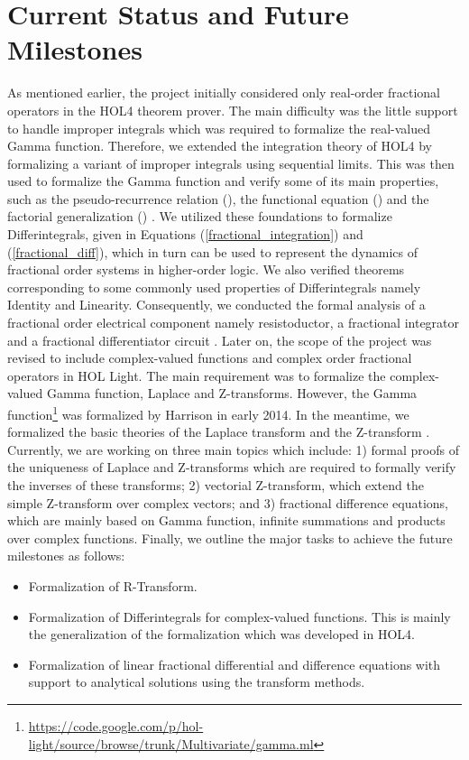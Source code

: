 \documentclass {llncs}
\begin{document}
\section{Current Status and Future Milestones} \label{sec:formalization}
As mentioned earlier, the project initially considered only real-order fractional operators in the HOL4 theorem prover.
The main difficulty was the little  support to handle improper integrals which was required to formalize the
real-valued Gamma function. Therefore, we extended the  integration theory of HOL4 by formalizing a variant of
improper integrals using sequential limits. This was then used to formalize the
Gamma function and verify some of its
main properties, such as the pseudo-recurrence relation (), the functional equation () and the factorial generalization () \cite{Umair_Gamma}.
We utilized these foundations to
formalize  Differintegrals, given in Equations (\ref{fractional_integration}) and (\ref{fractional_diff}),
which in turn can be used to represent the dynamics of fractional order systems in higher-order logic.
We also verified theorems corresponding to some commonly used properties of  Differintegrals namely
Identity and Linearity. Consequently, we conducted the formal analysis of a
 fractional order electrical component namely  resistoductor, a fractional integrator and a fractional differentiator circuit \cite{Umair_FMCAD_11}. Later on, the scope of the project was revised to include
complex-valued  functions and complex order fractional operators in HOL Light. The main requirement was to formalize the
complex-valued Gamma function, Laplace and Z-transforms.
However, the Gamma function\footnote{{\url{https://code.google.com/p/hol-light/source/browse/trunk/Multivariate/gamma.ml}}}
was formalized by Harrison in early 2014. In the meantime, we formalized the basic theories of the Laplace transform \cite {laplace_lpar}
and the Z-transform \cite{umair_itp_z}. Currently, we are working on three main topics which include: 1) formal proofs of the
uniqueness of Laplace and Z-transforms which are required to formally verify the inverses of these transforms; 2) vectorial Z-transform,
which extend the simple Z-transform over complex vectors; and 3) fractional difference equations, which are mainly based
on Gamma function, infinite summations and products over complex functions.
Finally, we outline the major tasks to  achieve the future milestones as follows:
\begin{itemize}
                        \item Formalization of R-Transform.
                        \item Formalization of Differintegrals for complex-valued functions. This is mainly the generalization of the formalization which was developed in HOL4.
                        \item Formalization of linear fractional differential and difference equations with support to analytical
                        solutions using the transform methods.
                      \end{itemize}
\end{document}
